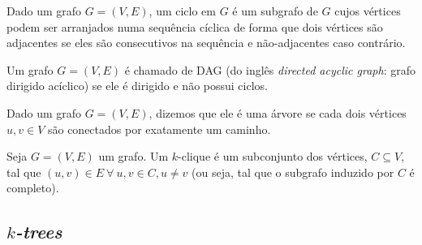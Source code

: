 \begin{definition}[ciclo]
  Dado um grafo $G = (V, E)$, um ciclo em $G$ é um subgrafo de $G$ cujos vértices podem ser arranjados numa sequência cíclica de forma que dois vértices são adjacentes se eles são consecutivos na sequência e não-adjacentes caso contrário.
\end{definition}

\begin{definition}[DAG]
  Um grafo $G = (V, E)$ é chamado de DAG (do inglês \emph{directed acyclic graph}: grafo dirigido acíclico) se ele é dirigido e não possui ciclos.
\end{definition}

\begin{definition}[árvore]
  Dado um grafo $G = (V, E)$, dizemos que ele é uma árvore se cada dois vértices $u, v \in V$ são conectados por exatamente um caminho.
\end{definition}

\begin{definition}[$k$-clique]
  Seja $G = (V, E)$ um grafo. Um $k$-clique é um subconjunto dos vértices, $C \subseteq V$, tal que $(u, v) \in E \ \forall \ u, v \in C, u \neq v$ (ou seja, tal que o subgrafo induzido por $C$ é completo).
\end{definition}

\subsection{\emph{$k$-trees}}

